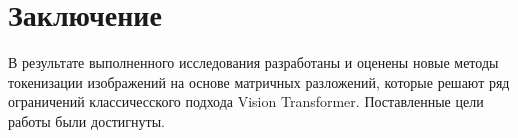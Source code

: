 \section*{Заключение}

В результате выполненного исследования разработаны и оценены новые методы токенизации изображений на основе матричных разложений, которые решают ряд ограничений классичесского подхода Vision Transformer. Поставленные цели работы были достигнуты.